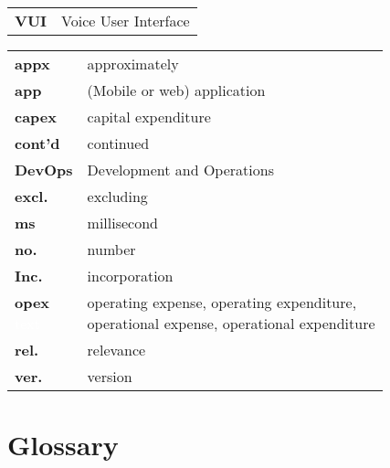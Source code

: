 \begin{flushleft}
\begin{tabular}{ll}
\textbf{VUI}	&	Voice User Interface\\




\end{tabular}
\end{flushleft}


\begin{flushleft}
	\begin{tabular}{ll}
		
\textbf{appx}	&	approximately\\
\textbf{app}	&	(Mobile or web) application\\
\textbf{capex}	&	capital expenditure\\
\textbf{cont'd}	&	continued\\
\textbf{DevOps}	&	Development and Operations\\
\textbf{excl.}	& 	excluding\\
\textbf{ms}	& 	millisecond\\

\textbf{no.}	& 	number\\

\textbf{Inc.}	&	incorporation\\
\shortstack[l]{\textbf{opex} \\ \textcolor{white}{text}}	& 	\shortstack[l]{operating expense, operating expenditure,\\ operational expense, operational expenditure} \\
\textbf{rel.}	&	relevance\\
\textbf{ver.}	& 	version \\
\end{tabular}
\end{flushleft}


\newpage
\section*{Glossary}
%


